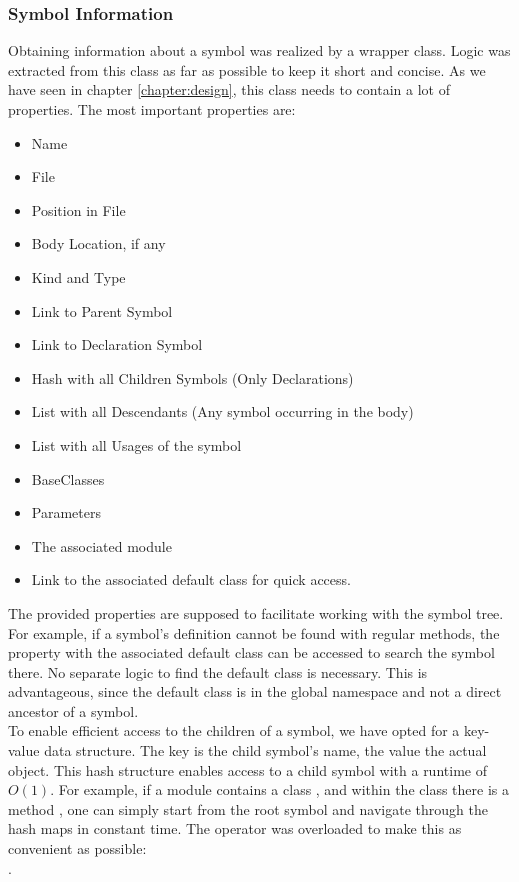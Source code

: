 \subsubsection{Symbol Information}
Obtaining information about a symbol was realized by a wrapper class.
Logic was extracted from this class as far as possible to keep it short and concise.
As we have seen in chapter \ref{chapter:design}, this class needs to contain a lot of properties.
The most important properties are:
\begin{itemize}
    \item Name
    \item File
    \item Position in File
    \item Body Location, if any
    \item Kind and Type
    \item Link to Parent Symbol
    \item Link to Declaration Symbol
    \item Hash with all Children Symbols (Only Declarations)
    \item List with all Descendants (Any symbol occurring in the body)
    \item List with all Usages of the symbol
    \item BaseClasses
    \item Parameters
    \item The associated module
    \item Link to the associated default class for quick access.
\end{itemize}

The provided properties are supposed to facilitate working with the symbol tree.
For example, if a symbol's definition cannot be found with regular methods,
the property with the associated default class can be accessed to search the symbol there.
No separate logic to find the default class is necessary.
This is advantageous, since the default class is in the global namespace and not a direct ancestor of a symbol.\\

To enable efficient access to the children of a symbol, we have opted for a key-value data structure.
The key is the child symbol's name, the value the actual  object.
This hash structure enables access to a child symbol with a runtime of $O(1)$.
For example, if a module  contains a class , and within the class there is a method ,
one can simply start from the root symbol and navigate through the hash maps in constant time.
The \code{[]} operator was overloaded to make this as convenient as possible:\\
.\\

